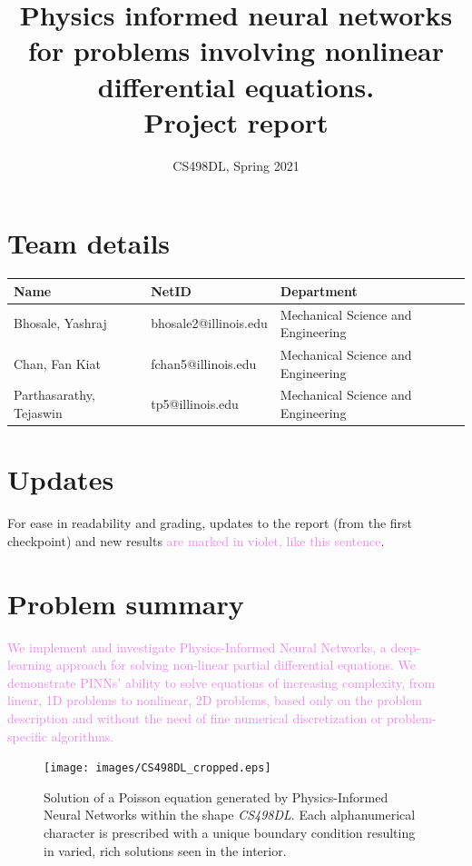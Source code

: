 \documentclass[11pt]{article}
\author{CS498DL, Spring 2021}
\date{}
\title{Physics informed neural networks for problems involving nonlinear differential equations.\\\medskip
\large Project report}
\newcommand{\newcontent}[1]{\textcolor{violet}{#1}}
\begin{document}
\maketitle

\section{Team details}
\label{sec:orgdda4956}
\begin{center}
\begin{tabular}{lll}
\toprule
Name & NetID & Department\\
\midrule
Bhosale, Yashraj & bhosale2@illinois.edu & Mechanical Science and Engineering\\
Chan, Fan Kiat & fchan5@illinois.edu & Mechanical Science and Engineering\\
Parthasarathy, Tejaswin & tp5@illinois.edu & Mechanical Science and Engineering\\
\bottomrule
\end{tabular}
\end{center}

\section{Updates}
\label{sec:org9bddb30}
For ease in readability and grading, updates to the report (from the first
checkpoint) and new results \newcontent{are marked in violet, like this sentence}.

\section{Problem summary}
\label{sec:orgb816686}
\newcontent{
We implement and investigate Physics-Informed Neural Networks, a deep-learning approach for solving non-linear
partial differential equations. We demonstrate PINNs' ability to solve
equations of increasing complexity, from linear, 1D problems to nonlinear, 2D
problems, based only on the problem description and without the need of fine
numerical discretization or problem-specific algorithms.
}

\begin{figure}[htbp]
\centering
\texttt{[image: images/CS498DL\_cropped.eps]}
\caption{\label{fig:cs498_poisson_results}Solution of a Poisson equation generated by Physics-Informed Neural Networks within the shape \emph{CS498DL}. Each alphanumerical character is prescribed with a unique boundary condition resulting in varied, rich solutions seen in the interior.}
\end{figure}
\end{document}
